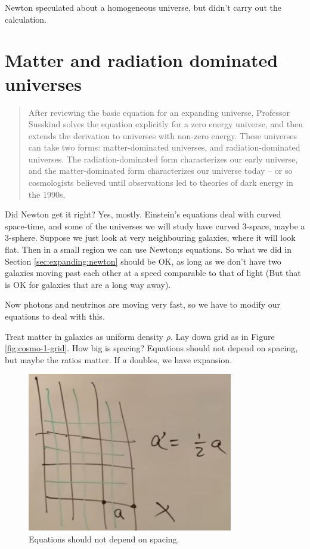 \documentclass[]{article}
\begin{document}
Newton speculated about a homogeneous universe, but didn't carry out the calculation.

\section{Matter and radiation dominated universes}\label{sec:matter:radiation:dominated}

\begin{quotation}
	After reviewing the basic equation for an expanding universe, Professor Susskind solves the equation explicitly for a zero energy universe, and then extends the derivation to universes with non-zero energy.  These universes can take two forms: matter-dominated universes, and radiation-dominated universes.  The radiation-dominated form characterizes our early universe, and the matter-dominated form characterizes our universe today -- or so cosmologists believed until observations led to theories of dark energy in the 1990s.
\end{quotation}

Did Newton get it right? Yes, mostly. Einstein's equations deal with curved space-time, and some of the universes we will study have curved 3-space, maybe a 3-sphere. Suppose we just look at very neighbouring galaxies, where it will look flat. Then in a small region we can use Newton;s equations. So what we did in Section \ref{sec:expanding:newton} should be OK, as long as we don't have two galaxies moving past each other at a speed comparable to that of light (But that is OK for galaxies that are a long way away).

Now photons and neutrinos are moving very fast, so  we have to modify our equations to deal with this.

Treat matter in galaxies as uniform density $\rho$. Lay down grid as in Figure \ref{fig:cosmo-1-grid}. How big is spacing? Equations should not depend on spacing, but maybe the ratios matter. If $a$ doubles, we have expansion.
\begin{figure}[H]
	\caption{Equations should not depend on spacing.}
	\includegraphics[width=0.8\textwidth]{cosmo-2-grid}
\end{figure}
\end{document}
